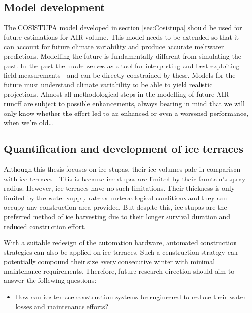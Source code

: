 \subsection{Model development}

The COSISTUPA model developed in section \ref{sec:Cosistupa} should be used for future estimations for AIR volume. This model
needs to be extended so that it can account for future climate variability and produce accurate meltwater
predictions. Modelling the future is fundamentally different from simulating the past: In the past the model
serves as a tool for interpreting and best exploiting field measurements - and can be directly constrained by
these. Models for the future must understand climate variability to be able to yield realistic projections.
Almost all methodological steps in the modelling of future AIR runoff are subject to possible enhancements,
always bearing in mind that we will only know whether the effort led to an enhanced or even a worsened
performance, when we're old...

\subsection{Quantification and development of ice terraces}

Although this thesis focuses on ice stupas, their ice volumes pale in comparison with ice terraces
\citep{nusserSociohydrologyArtificialGlaciers2019}. This is because ice stupas are limited by their fountain's
spray radius. However, ice terraces have no such limitations. Their thickness is only limited by the water
supply rate or meteorological conditions and they can occupy any construction area provided. But despite this, ice
stupas are the preferred method of ice harvesting due to their longer survival duration and reduced construction
effort.

With a suitable redesign of the automation hardware, automated construction strategies can also be applied on
ice terraces. Such a construction strategy can potentially compound their size every consecutive winter with
minimal maintenance requirements. Therefore, future research direction should aim to answer the following
questions:

\begin{itemize}

  \item How can ice terrace construction systems be engineered to reduce their water losses and maintenance
    efforts?

\end{itemize}

